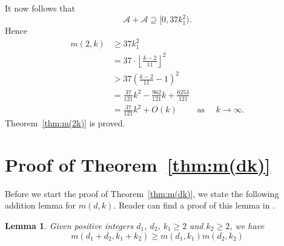\documentclass[11pt]{article}
\newtheorem{lemma}{Lemma}[section]
\theoremstyle{definition}
\begin{document}
It now follows that 
\[
\mathscr{A} + \mathscr{A} \supseteq [0, 37k_1^2).
\]
Hence
\begin{align*}
m(2,k) &\geq 37k_1^2\\
&= 37 \cdot \left \lfloor \frac{k - 2}{11}\right \rfloor^2\\
&> 37 \left(\frac{k - 2}{11} -1\right) ^2\\
&= \frac{37}{121}k^2-\frac{962}{121}k+\frac{6253}{121}\\
&= \frac{37}{121}k^2 + O(k)\qquad \text{ as }\quad k \to \infty. 
\end{align*}
Theorem~\ref{thm:m(2k)} is proved.




\section{Proof of Theorem~\ref{thm:m(dk)}}

Before we start the proof of Theorem~\ref{thm:m(dk)}, we state the following addition lemma for $m(d,k)$. Reader can find a proof of this lemma in \cite{Hsu-Jia:CombinatorialNetworks}.

\begin{lemma}\label{lemma:addition}
Given positive integers $d_{1}$, $d_{2}$, $k_{1}\ge2$ and $k_{2}\ge 2$, we have
\[
m(d_1+d_2,k_1+k_2) \geq m(d_1,k_1)m(d_2,k_2) 
\]
\end{lemma}
\end{document}
